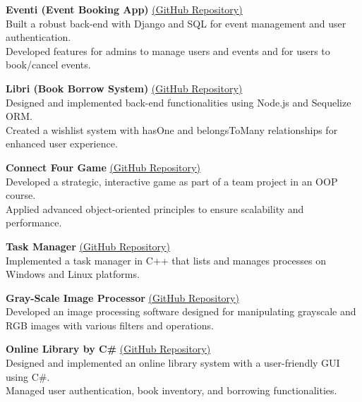 \textbf{Eventi (Event Booking App)} \href{https://github.com/YassenAli/Event-System}{(GitHub Repository)}  \\
\textbullet{}\hspace{2mm} Built a robust back-end with Django and SQL for event management and user authentication.  \\
\textbullet{}\hspace{2mm} Developed features for admins to manage users and events and for users to book/cancel events.

\textbf{Libri (Book Borrow System)} \href{https://github.com/YassenAli/Libri}{(GitHub Repository)}  \\
\textbullet{}\hspace{2mm} Designed and implemented back-end functionalities using Node.js and Sequelize ORM.  \\
\textbullet{}\hspace{2mm} Created a wishlist system with hasOne and belongsToMany relationships for enhanced user experience.

\textbf{Connect Four Game} \href{https://github.com/YassenAli/XO-Game-by-CPP}{(GitHub Repository)}  \\
\textbullet{}\hspace{2mm} Developed a strategic, interactive game as part of a team project in an OOP course.  \\
\textbullet{}\hspace{2mm} Applied advanced object-oriented principles to ensure scalability and performance.

\textbf{Task Manager} \href{https://github.com/YassenAli/Task-Manager-by-CPP}{(GitHub Repository)}  \\
\textbullet{}\hspace{2mm} Implemented a task manager in C++ that lists and manages processes on Windows and Linux platforms.

\textbf{Gray-Scale Image Processor} \href{https://github.com/YassenAli/Gray-Scale-Image-Processor-by-CPP}{(GitHub Repository)}  \\
\textbullet{}\hspace{2mm} Developed an image processing software designed for manipulating grayscale and RGB images with various filters and operations.

\textbf{Online Library by C\#} \href{https://github.com/YassenAli/Online-Library-by-C-sharp}{(GitHub Repository)}  \\
\textbullet{}\hspace{2mm} Designed and implemented an online library system with a user-friendly GUI using C\#.  \\
\textbullet{}\hspace{2mm} Managed user authentication, book inventory, and borrowing functionalities.

